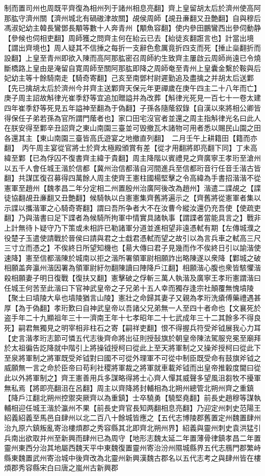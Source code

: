 制而置司州也周既平齊復為相州列于諸州相息亮翻】齊上皇留胡太后於濟州使高阿那肱守濟州關【濟州城北有碢磝津故關】覘侯周師【覘丑亷翻又丑艶翻】自與穆后馮淑妃幼主韓長鸞鄧長顒等數十人奔青州【顒魚容翻】使内參田鵬鸞西出參伺動静【參候也伺相吏翻】周師獲之問齊主何在紿云已去【紿徒亥翻誑言也】計當出境【謂出齊境也】周人疑其不信捶之每折一支辭色愈厲竟折四支而死【捶止橤翻折而設翻】上皇至青州即欲入陳而高阿那肱密召周師約生致齊主屢啟云周師尚遠已令燒斷橋路上皇由是淹留自寛周師至關阿那肱即降之周師奄至青州上皇囊金繫於鞍與后妃幼主等十餘騎南走【騎奇寄翻】己亥至南鄧村尉遲勤追及盡擒之并胡太后送鄴【先已擒胡太后於濟州今并齊主送鄴齊天保元年更禪歲在庚午四主二十八年而亡】庚子周主詔故斛律光崔季舒等宜追加贈謚并為改葬【斛律光死見一百七十一卷太建四年崔季舒等死見五年謚神至翻為于偽翻】子孫各隨䕃叙錄【自漢以來將相公卿皆得保任子弟若孫為官所謂門䕃者也】家口田宅沒官者並還之周主指斛律光名曰此人在朕安得至鄴辛丑詔齊之東山南園三臺並可毁撤瓦木諸物可用者悉以賜民山園之田各還其主【東山南園三臺皆高氏遊宴之地撤直列翻】　二月壬午上耕籍田【籍而亦翻】　丙午周主宴從官將士於齊太極殿頒賞有差【從才用翻將即亮翻下同】丁未高緯至鄴【已為俘囚不復書齊主緯于貴翻】周主降階以賓禮見之齊廣寧王孝珩至滄州以五千人會任城王湝於信都【冀州治信都湝自河間進兵至信都珩音行任音壬湝古皆翻】共謀匡復召募得四萬餘人周主使齊王憲柱國楊堅擊之令高緯為手書招湝湝不從憲軍至趙州【魏孝昌二年分定相二州置殷州治廣阿後改為趙州】湝遣二諜覘之【諜徒協翻覘丑亷翻又丑艶翻】候騎執以白憲憲集齊舊將遍示之【齊舊將從憲軍者集以示諜以攜湝軍之心騎奇寄翻】謂曰吾所争者大不在汝曹今縱汝還仍充吾使【使疏吏翻】乃與湝書曰足下諜者為候騎所拘軍中情實具諸執事【謂諜者當能具言之】戰非上計無待卜疑守乃下策或未相許已勒諸軍分道並進相望非遠憑軾有期【左傳城濮之役楚子玉遣使請戰於晉侯曰請與君之士戱君憑軾而望之故引以為言兵車之軾高三尺三寸立而憑之】不俟終日所望知機也【昜大傳曰君子見幾而作不俟終日引以諭湝使速降】憲至信都湝陳於城南以拒之湝所署領軍尉相願詐出略陳遂以衆降【鄴城之破相願盖奔瀛州湝因署為領軍尉紆勿翻陳讀曰陣降戶江翻】相願湝心腹也衆皆駭懼湝殺相願妻子明日復戰【復扶又翻】憲擊破之俘斬三萬人執湝及廣寧王孝珩憲謂湝曰任城王何苦至此湝曰下官神武皇帝之子兄弟十五人幸而獨存逢宗社顛覆無愧墳陵【聚土曰墳陵大阜也墳陵猶言山陵】憲壯之命歸其妻子又親為孝珩洗瘡傅藥禮遇甚厚【為于偽翻】孝珩歎曰自神武皇帝以吾諸父兄弟無一人至四十者命也【文襄死於盗手年二十九顯祖年三十一濟南王年十七孝昭年二十七武成年三十二其餘多不得良死】嗣君無獨見之明宰相非柱石之寄【嗣祥吏翻】恨不得握兵符受斧钺展我心力耳【史言湝孝珩志節可憐五代志後齊命將出征則授鼔旗於朝皇帝陳法駕服兖冕至廟拜於太祖徧告訖降就中階引上將操钺授柯曰從此上至天將軍制之又操斧授柯曰從此下至泉將軍制之將軍既受斧钺對曰國不可從外理軍不可從中制臣既受命有鼓旗斧钺之威願無一言之命於臣帝曰苟利社稷將軍裁之將軍就車載斧钺而出皇帝推轂度閫曰從此以外將軍制之】齊王憲善用兵多謀略得將士心齊人憚其威聲多望風沮芻牧不擾軍無私焉【將即亮翻沮在呂翻】周主以齊降將封輔相為北朔州總管北朔州齊之重鎮【降戶江翻北朔州控禦突厥齊以為重鎮】士卒驍勇【驍堅堯翻】前長史趙穆等謀執輔相迎任城王湝於瀛州不果【前長史齊官長知两翻相息亮翻】乃迎定州刺史范陽王紹義紹義至馬邑自肆州以北二百八十餘城皆應之【五代志博陵郡舊置定州魏置肆州治九原六鎮叛亂寄治樓煩郡之秀容縣其北即齊北朔州界】紹義與靈州刺史袁洪猛引兵南出欲取并州至新興而肆州已為周守【地形志魏太延二年置薄骨律鎮孝昌二年置靈州東西分治其地屬西魏天平中東魏復置靈州寄治汾州隰城縣界五代志鴈門郡繁峙縣東魏置武州寄治城中後齊改為北靈州新興漢魏古郡名以五代志考之與肆州皆在樓煩郡秀容縣宋白曰唐之嵐州古新興郡